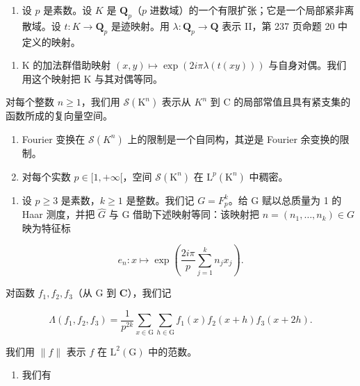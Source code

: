 \begin{enumerate}
\def\labelenumi{\arabic{enumi})}
\setcounter{enumi}{21}
\tightlist
\item
  设 \(p\) 是素数。设 \(K\) 是 \(\mathbf{Q}_p\)（\(p\) 进数域）的一个有限扩张；它是一个局部紧非离散域。设 \(t: K \to \mathbf{Q}_p\) 是迹映射。用 \(\lambda: \mathbf{Q}_p \to \mathbf{Q}\) 表示 II，第 237 页命题 20 中定义的映射。
\end{enumerate}

\begin{enumerate}
\def\labelenumi{\alph{enumi})}
\tightlist
\item
  K 的加法群借助映射 \((x,y)\mapsto\exp(2i\pi\lambda(t(xy)))\) 与自身对偶。我们用这个映射把 K 与其对偶等同。
\end{enumerate}

对每个整数 \(n \geqslant 1\)，我们用 \(\mathcal{S}(\mathrm{K}^{n})\) 表示从 \(K^{n}\) 到 C 的局部常值且具有紧支集的函数所成的复向量空间。

\begin{enumerate}
\def\labelenumi{\alph{enumi})}
\setcounter{enumi}{1}
\item
  Fourier 变换在 \(\mathcal{S}(K^{n})\) 上的限制是一个自同构，其逆是 Fourier 余变换的限制。
\item
  对每个实数 \(p \in [1, +\infty[\)，空间 \(\mathcal{S}(\mathrm{K}^n)\) 在 \(\mathrm{L}^p (\mathrm{K}^n)\) 中稠密。
\end{enumerate}

\begin{enumerate}
\def\labelenumi{\arabic{enumi})}
\setcounter{enumi}{22}
\tightlist
\item
  设 \(p \geqslant 3\) 是素数，\(k \geqslant 1\) 是整数。我们记 \(G = F_{p}^{k}\)。给 G 赋以总质量为 1 的 Haar 测度，并把 \(\widehat{G}\) 与 G 借助下述映射等同：该映射把 \(n = (n_{1}, \ldots, n_{k}) \in G\) 映为特征标
\end{enumerate}

\[
e _ {n} \colon x \mapsto \exp \left(\frac {2 i \pi}{p} \sum_ {j = 1} ^ {k} n _ {j} x _ {j}\right).
\]

对函数 \(f_{1}, f_{2}, f_{3}\)（从 G 到 \(\mathbf{C}\)），我们记

\[
\Lambda (f _ {1}, f _ {2}, f _ {3}) = \frac {1}{p ^ {2 k}} \sum_ {x \in \mathrm{G}} \sum_ {h \in \mathrm{G}} f _ {1} (x) f _ {2} (x + h) f _ {3} (x + 2 h).
\]

我们用 \(\| f\|\) 表示 \(f\) 在 \(\mathrm{L}^2 (\mathrm{G})\) 中的范数。

\begin{enumerate}
\def\labelenumi{\alph{enumi})}
\tightlist
\item
我们有
\end{enumerate}

